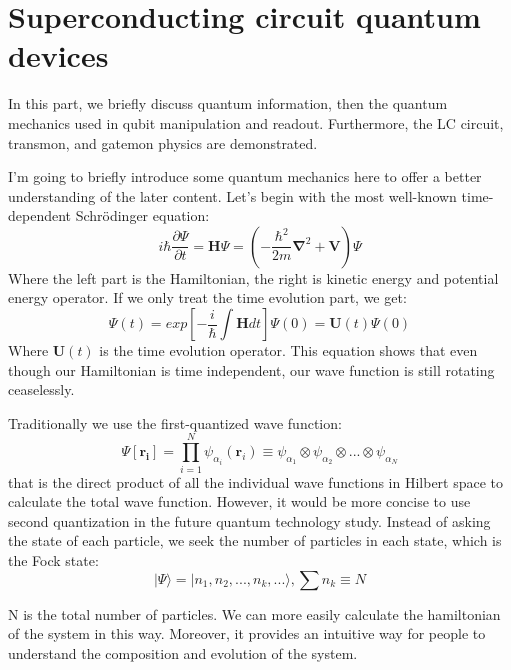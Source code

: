 \clearpage

\section{Superconducting circuit quantum devices}
In this part, we briefly discuss quantum information, then the quantum mechanics used in qubit manipulation and readout. Furthermore, the LC circuit, transmon, and gatemon physics are demonstrated.
 
I'm going to briefly introduce some quantum mechanics here to offer a better understanding of the later content. Let's begin with the most well-known time-dependent Schrödinger equation:
\begin{equation}\label{Scho-eq}
    i\hbar \frac{\partial \Psi}{\partial t} = \mathbf{H}\Psi = (-\frac{\hbar^2}{2m}\mathbf{\nabla}^2 + \mathbf{V})\Psi
\end{equation}
Where the left part is the Hamiltonian, the right is kinetic energy and potential energy operator. If we only treat the time evolution part, we get:
\begin{equation}\label{Time-evo}
    \Psi(t) = exp[-\frac{i}{\hbar}\int \mathbf{H}dt]\Psi(0) = \mathbf{U}(t)\Psi(0)
\end{equation}
Where $\mathbf{U}(t)$ is the time evolution operator. This equation shows that even though our Hamiltonian is time independent, our wave function is still rotating ceaselessly.

Traditionally we use the first-quantized wave function:
\begin{equation}
    \Psi[\mathbf{r_i}] = \prod_{i=1}^{N}\psi_{\alpha_i}(\mathbf{r}_i) \equiv \psi_{\alpha_1} \otimes \psi_{\alpha_2}\otimes ... \otimes \psi_{\alpha_N}  
\end{equation}
that is the direct product of all the individual wave functions in Hilbert space to calculate the total wave function. However, it would be more concise to use second quantization in the future quantum technology study. Instead of asking the state of each particle, we seek the number of particles in each state, which is the Fock state:
\begin{equation}
    |\Psi\rangle = |n_1, n_2, ..., n_k, ...\rangle, \sum n_k\equiv N
\end{equation}

N is the total number of particles. We can more easily calculate the hamiltonian of the system in this way. Moreover, it provides an intuitive way for people to understand the composition and evolution of the system.


